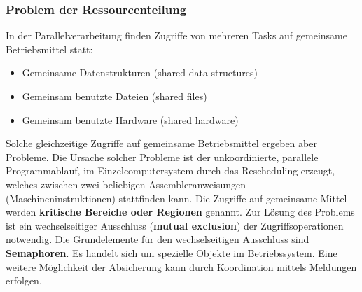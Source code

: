 \subsubsection{Problem der Ressourcenteilung}
In der Parallelverarbeitung finden Zugriffe von mehreren Tasks auf gemeinsame
Betriebsmittel statt:
\begin{itemize}
    \item Gemeinsame Datenstrukturen (shared data structures)
    \item Gemeinsam benutzte Dateien (shared files)
    \item Gemeinsam benutzte Hardware (shared hardware)
\end{itemize}
Solche gleichzeitige Zugriffe auf gemeinsame Betriebsmittel ergeben aber Probleme. Die Ursache solcher Probleme ist der unkoordinierte, parallele Programmablauf, im Einzelcomputersystem durch das Rescheduling erzeugt, welches
zwischen zwei beliebigen Assembleranweisungen (Maschineninstruktionen) stattfinden kann. Die Zugriffe auf gemeinsame Mittel werden \textbf{kritische Bereiche oder Regionen}
genannt. Zur Lösung des Problems ist ein wechselseitiger Ausschluss (\textbf{mutual exclusion})
der Zugriffsoperationen notwendig.
Die Grundelemente für den wechselseitigen Ausschluss sind \textbf{Semaphoren}. Es handelt sich um spezielle Objekte im Betriebssystem.
Eine weitere Möglichkeit der Absicherung kann durch Koordination mittels
Meldungen erfolgen.

